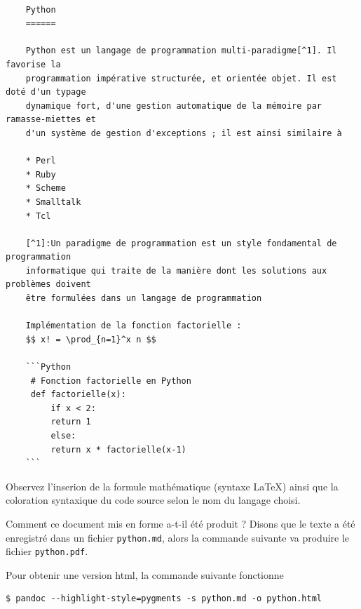 \documentclass[]{article}
\newenvironment{Shaded}{}{}
\newcommand{\NormalTok}[1]{{#1}}
\begin{document}
\begin{verbatim}

    Python
    ======

    Python est un langage de programmation multi-paradigme[^1]. Il favorise la
    programmation impérative structurée, et orientée objet. Il est doté d'un typage
    dynamique fort, d'une gestion automatique de la mémoire par ramasse-miettes et
    d'un système de gestion d'exceptions ; il est ainsi similaire à 

    * Perl
    * Ruby
    * Scheme
    * Smalltalk
    * Tcl

    [^1]:Un paradigme de programmation est un style fondamental de programmation
    informatique qui traite de la manière dont les solutions aux problèmes doivent
    être formulées dans un langage de programmation

    Implémentation de la fonction factorielle :
    $$ x! = \prod_{n=1}^x n $$

    ```Python
     # Fonction factorielle en Python
     def factorielle(x):
         if x < 2:
         return 1
         else:
         return x * factorielle(x-1)
    ```
\end{verbatim}
Observez l'inserion de la formule mathématique (syntaxe LaTeX) ainsi que
la coloration syntaxique du code source selon le nom du langage choisi.

Comment ce document mis en forme a-t-il été produit ? Disons que le
texte a été enregistré dans un fichier \texttt{python.md}, alors la
commande suivante va produire le fichier \texttt{python.pdf}.

\begin{Shaded}
\end{Shaded}
Pour obtenir une version html, la commande suivante fonctionne

\begin{verbatim}
$ pandoc --highlight-style=pygments -s python.md -o python.html
\end{verbatim}
\end{document}
